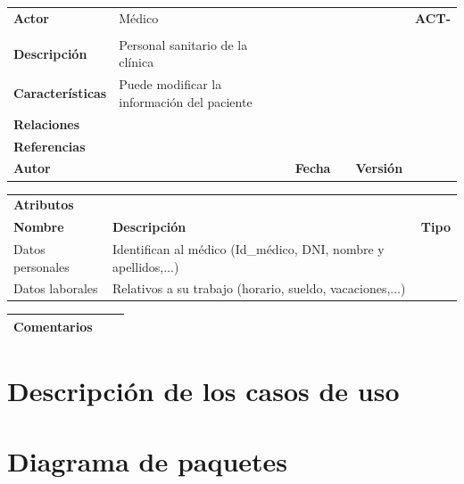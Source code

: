 \documentclass[11pt,a4paper]{article}
\newcounter{ActCounter}
\newcommand{\act}[1]{\addtocounter{ActCounter}{1}\textbf{\rmfamily ACT-\theActCounter}\quad#1\\}
\begin{document}
\begin{table}[h]
\centering
\label{my-label}
\begin{tabular}{l| p{5cm} llll}

\textbf{Actor}           & Médico & & & & \act \\ 

\textbf{Descripción}     & Personal sanitario de la clínica& & & & \\
\textbf{Características} & Puede modificar la información del paciente & & & & \\ 
\textbf{Relaciones}      & & & & & \\ 
\textbf{Referencias}     & & & & & \\ 
\textbf{Autor}           &  & \textbf{Fecha} & & \textbf{Versión} & \\ 
\end{tabular}
\bigskip
\centering
\label{my-label}
\begin{tabular}{lll}
\textbf{Atributos} &  & \\
\textbf{Nombre}    & \textbf{Descripción} & \textbf{Tipo} \\ \hline
Datos personales   &  Identifican al médico (Id\_médico, DNI, nombre y apellidos,...)     & \\
Datos laborales    & Relativos a su trabajo (horario, sueldo, vacaciones,...)&              
\end{tabular}
\bigskip
\centering
\begin{tabular}{lll}
\textbf{Comentarios} &  &  \\ \hline
\end{tabular}
\end{table}

\section{Descripción de los casos de uso}


\section{Diagrama de paquetes}

	
\end{document}
